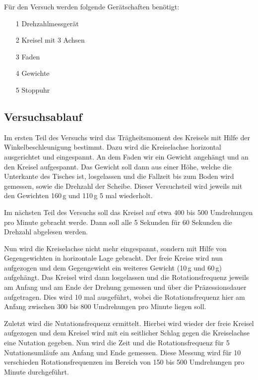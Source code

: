 \documentclass[fontsize=12pt]{scrartcl}
\begin{document}
Für den Versuch werden folgende Gerätschaften benötigt:
\begin{itemize}
\item[1] Drehzahlmessgerät
\item[2] Kreisel mit 3 Achsen
\item[3] Faden
\item[4] Gewichte
\item[5] Stoppuhr
\end{itemize}

\newpage

\subsection{Versuchsablauf}

Im ersten Teil des Versuchs wird das Trägheitsmoment des Kreisels mit Hilfe der Winkelbeschleunigung bestimmt. Dazu wird die Kreiselachse horizontal ausgerichtet und eingespannt. An dem Faden wir ein Gewicht angehängt und an den Kreisel aufgespannt. Das Gewicht soll dann aus einer Höhe, welche die Unterkante des Tisches ist, losgelassen und die Fallzeit bis zum Boden wird gemessen, sowie die Drehzahl der Scheibe. Dieser Versuchsteil wird jeweils mit den Gewichten 160\,g und 110\,g 5 mal wiederholt. \par 

Im nächsten Teil des Versuchs soll das Kreisel auf etwa 400 bis 500 Umdrehungen pro Minute gebracht werde. Dann soll alle 5 Sekunden für 60 Sekunden die Drehzahl abgelesen werden.

Nun wird die Kreiselachse nicht mehr eingespannt, sondern mit Hilfe von Gegengewichten in horizontale Lage gebracht.  
Der freie Kreise wird nun aufgezogen und dem Gegengewicht ein weiteres Gewicht (10\,g und 60\,g) aufgehängt. Das Kreisel wird dann losgelassen und die Rotationsfrequenz jeweils am Anfang und am Ende der Drehung gemessen und über die Präzessionsdauer aufgetragen. Dies wird 10 mal ausgeführt, wobei die Rotationsfrequenz hier am Anfang zwischen 300 bis 800 Umdrehungen pro Minute liegen soll.

Zuletzt wird die Nutationsfrequenz ermittelt. Hierbei wird wieder der freie Kreisel aufgezogen und dem Kreisel wird mit ein seitlicher Schlag gegen die Kreiselachse eine Nutation gegeben. Nun wird die Zeit und die Rotationsfrequenz für 5 Nutationsumläufe am Anfang und Ende gemessen.  Diese Messung wird für 10 verschieden Rotationsfrequenzen im Bereich von 150 bis 500 Umdrehungen pro Minute durchgeführt.
\end{document}
